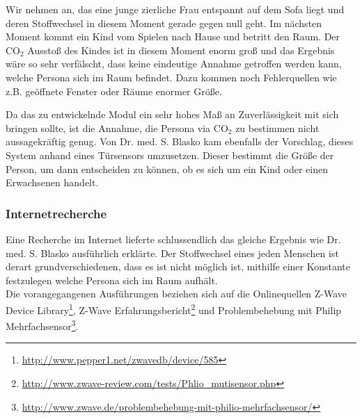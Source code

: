 Wir nehmen an, das eine junge zierliche Frau entspannt auf dem Sofa liegt und deren Stoffwechsel in diesem Moment gerade gegen null geht. Im nächsten Moment kommt ein Kind vom Spielen nach Hause und betritt den Raum. Der CO$_2$ Ausstoß des Kindes ist in diesem Moment enorm groß und das Ergebnis wäre so sehr verfälscht, dass keine eindeutige Annahme getroffen werden kann, welche Persona sich im Raum befindet. Dazu kommen noch Fehlerquellen wie z.B. geöffnete Fenster
oder Räume enormer Größe.

Da das zu entwickelnde Modul ein sehr hohes Maß an Zuverlässigkeit mit sich
bringen sollte, ist die Annahme, die Persona via CO$_2$ zu bestimmen nicht aussagekräftig genug. Von Dr. med. S. Blasko kam ebenfalls der Vorschlag, dieses System anhand eines Türsensors umzusetzen. Dieser bestimmt die Größe der Person, um dann entscheiden zu können, ob es sich um ein Kind oder einen Erwachsenen handelt.

\subsubsection{Internetrecherche}
Eine Recherche im Internet lieferte schlussendlich das gleiche Ergebnis wie  Dr. med. S. Blasko ausführlich erklärte. Der Stoffwechsel eines jeden Menschen ist derart grundverschiedenen, dass es ist nicht möglich ist, mithilfe einer Konstante festzulegen welche Persona sich im Raum aufhält.\\

\noindent
Die vorangegangenen Ausführungen beziehen sich auf die Onlinequellen \glqq Z-Wave Device Library\grqq\footnote{\url{http://www.pepper1.net/zwavedb/device/585}}, \glqq Z-Wave Erfahrungsbericht\grqq\footnote{\url{http://www.zwave-review.com/tests/Phlio_mutisensor.php}} und \glqq Problembehebung mit Philip Mehrfachsensor\grqq\footnote{\url{http://www.zwave.de/problembehebung-mit-philio-mehrfachsensor/}}.